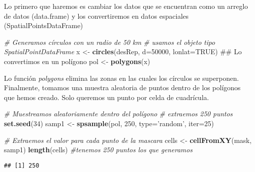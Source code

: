 \documentclass[]{article}
\newenvironment{Shaded}{\begin{snugshade}}{\end{snugshade}}
\newcommand{\KeywordTok}[1]{\textcolor[rgb]{0.13,0.29,0.53}{\textbf{{#1}}}}
\newcommand{\DataTypeTok}[1]{\textcolor[rgb]{0.13,0.29,0.53}{{#1}}}
\newcommand{\DecValTok}[1]{\textcolor[rgb]{0.00,0.00,0.81}{{#1}}}
\newcommand{\StringTok}[1]{\textcolor[rgb]{0.31,0.60,0.02}{{#1}}}
\newcommand{\CommentTok}[1]{\textcolor[rgb]{0.56,0.35,0.01}{\textit{{#1}}}}
\newcommand{\OtherTok}[1]{\textcolor[rgb]{0.56,0.35,0.01}{{#1}}}
\newcommand{\NormalTok}[1]{{#1}}
\begin{document}
Lo primero que haremos es cambiar los datos que se encuentran como un
arreglo de datos (data.frame) y los convertiremos en datos espaciales
(SpatialPointsDataFrame)

\begin{Shaded}
\begin{Highlighting}[]
\CommentTok{# Generamos círculos con un radio de 50 km}
\CommentTok{# usamos el objeto tipo SpatialPointDataFrame}
\NormalTok{x <-}\StringTok{ }\KeywordTok{circles}\NormalTok{(desRep, }\DataTypeTok{d=}\DecValTok{50000}\NormalTok{, }\DataTypeTok{lonlat=}\OtherTok{TRUE}\NormalTok{)}
\NormalTok{## Lo convertimos en un polígono}
\NormalTok{pol <-}\StringTok{ }\KeywordTok{polygons}\NormalTok{(x)}
\end{Highlighting}
\end{Shaded}

Lo función \emph{polygons} elimina las zonas en las cuales los círculos
se superponen. Finalmente, tomamos una muestra aleatoria de puntos
dentro de los polígonos que hemos creado. Solo queremos un punto por
celda de cuadrícula.

\begin{Shaded}
\begin{Highlighting}[]
\CommentTok{# Muestreamos aleatoriamente dentro del polígono}
\CommentTok{# extraemos 250 puntos}
\KeywordTok{set.seed}\NormalTok{(}\DecValTok{34}\NormalTok{)}
\NormalTok{samp1 <-}\StringTok{ }\KeywordTok{spsample}\NormalTok{(pol, }\DecValTok{250}\NormalTok{, }\DataTypeTok{type=}\StringTok{'random'}\NormalTok{, }\DataTypeTok{iter=}\DecValTok{25}\NormalTok{)}

\CommentTok{# Extraemos el valor para cada punto de la mascara}
\NormalTok{cells <-}\StringTok{ }\KeywordTok{cellFromXY}\NormalTok{(mask, samp1)}
\KeywordTok{length}\NormalTok{(cells) }\CommentTok{#tenemos 250 puntos los que generamos}
\end{Highlighting}
\end{Shaded}

\begin{verbatim}
## [1] 250
\end{verbatim}

\begin{Shaded}
\end{Shaded}
\end{document}
